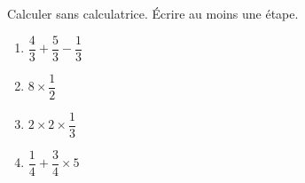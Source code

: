 \documentclass[exercice]{thedocument}%
\begin{document}
%
Calculer sans calculatrice. Écrire au moins une étape.
\begin{enumerate}
    \item $\dfrac43+\dfrac53-\dfrac13$
    \item $8\times\dfrac12$
    \item $2\times2\times\dfrac13$
    \item $\dfrac14+\dfrac34\times5$
\end{enumerate}
\end{document}
